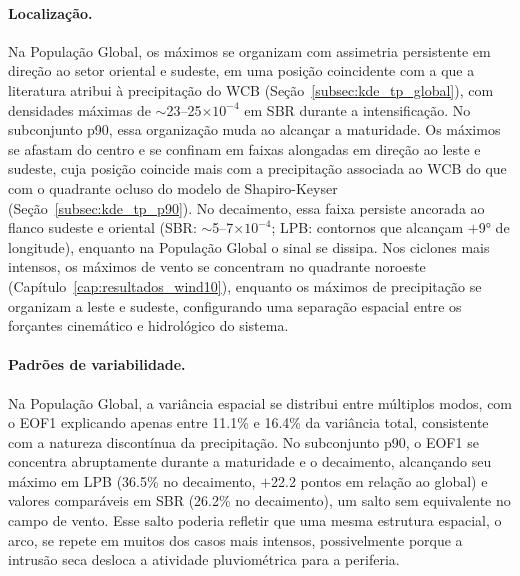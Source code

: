 \paragraph{Localização.}
Na População Global, os máximos se organizam com assimetria persistente em direção ao setor oriental e sudeste, em uma posição coincidente com a que a literatura atribui à precipitação do WCB (Seção~\ref{subsec:kde_tp_global}), com densidades máximas de ${\sim}$23--25$\times10^{-4}$ em SBR durante a intensificação. No subconjunto p90, essa organização muda ao alcançar a maturidade. Os máximos se afastam do centro e se confinam em faixas alongadas em direção ao leste e sudeste, cuja posição coincide mais com a precipitação associada ao WCB do que com o quadrante ocluso do modelo de Shapiro-Keyser (Seção~\ref{subsec:kde_tp_p90}). No decaimento, essa faixa persiste ancorada ao flanco sudeste e oriental (SBR: ${\sim}$5--7$\times10^{-4}$; LPB: contornos que alcançam $+$9° de longitude), enquanto na População Global o sinal se dissipa. Nos ciclones mais intensos, os máximos de vento se concentram no quadrante noroeste (Capítulo~\ref{cap:resultados_wind10}), enquanto os máximos de precipitação se organizam a leste e sudeste, configurando uma separação espacial entre os forçantes cinemático e hidrológico do sistema.

\paragraph{Padrões de variabilidade.}
Na População Global, a variância espacial se distribui entre múltiplos modos, com o EOF1 explicando apenas entre 11.1\% e 16.4\% da variância total, consistente com a natureza discontínua da precipitação. No subconjunto p90, o EOF1 se concentra abruptamente durante a maturidade e o decaimento, alcançando seu máximo em LPB (36.5\% no decaimento, $+$22.2 pontos em relação ao global) e valores comparáveis em SBR (26.2\% no decaimento), um salto sem equivalente no campo de vento. Esse salto poderia refletir que uma mesma estrutura espacial, o arco, se repete em muitos dos casos mais intensos, possivelmente porque a intrusão seca desloca a atividade pluviométrica para a periferia.

